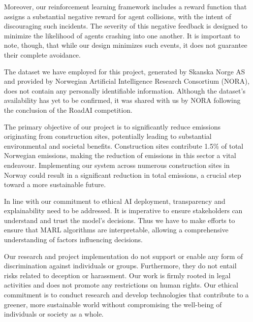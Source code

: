 \documentclass[conference]{IEEEtran}
\begin{document}
Moreover, our reinforcement learning framework includes a reward function that assigns a substantial
negative reward for agent collisions, with the intent of discouraging such incidents. The severity of
this negative feedback is designed to minimize the likelihood of agents crashing into one another. It
is important to note, though, that while our design minimizes such events, it does not guarantee their
complete avoidance.

The dataset we have employed for this project, generated by Skanska Norge AS and provided by Norwegian
Artificial Intelligence Research Consortium (NORA), does not contain any personally identifiable
information. Although the dataset's availability has yet to be confirmed, it was shared with us by NORA
following the conclusion of the RoadAI competition.

The primary objective of our project is to significantly reduce \coo emissions originating from
construction sites, potentially leading to substantial environmental and societal benefits.
Construction sites contribute 1.5\% of total Norwegian \coo emissions, making the reduction of
emissions in this sector a vital endeavour. Implementing our system across numerous construction sites
in Norway could result in a significant reduction in total \coo emissions, a crucial step toward a more
sustainable future.

In line with our commitment to ethical AI deployment, transparency and explainability need to be
addressed. It is imperative to ensure stakeholders can understand and trust the model's decisions.
Thus we have to make efforts to ensure that MARL algorithms are interpretable, allowing a comprehensive
understanding of factors influencing decisions.

Our research and project implementation do not support or enable any form of discrimination against
individuals or groups. Furthermore, they do not entail risks related to deception or harassment.
Our work is firmly rooted in legal activities and does not promote any restrictions on human rights.
Our ethical commitment is to conduct research and develop technologies that contribute to a greener,
more sustainable world without compromising the well-being of individuals or society as a whole.
\end{document}
